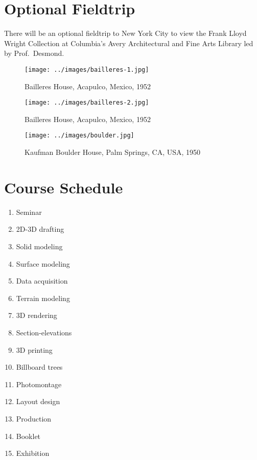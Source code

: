 \documentclass[11pt,article,oneside]{memoir}
\begin{document}
\section{Optional Fieldtrip}
There will be an optional fieldtrip to New York City 
to view the Frank Lloyd Wright Collection 
at Columbia's Avery Architectural and Fine Arts Library 
led by Prof.~Desmond. 

\clearpage


\begin{figure}
\begin{center}
%
\texttt{[image: ../images/bailleres-1.jpg]}
\caption{Bailleres House, Acapulco, Mexico, 1952}
%
\texttt{[image: ../images/bailleres-2.jpg]}
\caption{Bailleres House, Acapulco, Mexico, 1952}
%
\texttt{[image: ../images/boulder.jpg]}
\caption{Kaufman Boulder House, Palm Springs, CA, USA, 1950}
%
\label{fig:unbuilt_houses}
\end{center}
\end{figure}

\clearpage


\section{Course Schedule}

\begin{multicols}{3}
\begin{enumerate}[label=\textbf{\arabic*}]
%
\item Seminar
\item 2D-3D drafting
\item Solid modeling
\item Surface modeling
\item Data acquisition
\item Terrain modeling
\item 3D rendering
\item Section-elevations
\item 3D printing
\item Billboard trees
\item Photomontage
\item Layout design
\item Production
%
\item Booklet
\item Exhibition
%
\end{enumerate}
\end{multicols}
\end{document}
